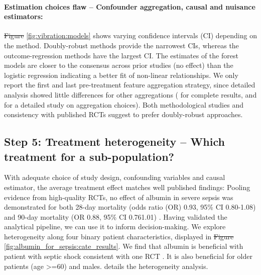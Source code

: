 \documentclass[10pt,letterpaper]{article}
\providecommand{\DIFaddtex}[1]{{\protect\color{blue}\uwave{#1}}} %
\providecommand{\DIFdeltex}[1]{{\protect\color{red}\sout{#1}}}                      %
\providecommand{\DIFaddbegin}{} %
\providecommand{\DIFaddend}{} %
\providecommand{\DIFdelbegin}{} %
\providecommand{\DIFdelend}{} %
\providecommand{\DIFadd}[1]{\texorpdfstring{\DIFaddtex{#1}}{#1}} %
\providecommand{\DIFdel}[1]{\texorpdfstring{\DIFdeltex{#1}}{}} %
\newcommand{\DIFscaledelfig}{0.5}
\newlength{\DIFdelgraphicswidth} %
\newlength{\DIFdelgraphicsheight} %
\newcommand{\DIFaddincludegraphics}[2][]{{\color{blue}\fbox{\DIFOincludegraphics[#1]{#2}}}} %
\newcommand{\DIFdelincludegraphics}[2][]{%
\sbox{\DIFdelgraphicsbox}{\DIFOincludegraphics[#1]{#2}}%
\settoboxwidth{\DIFdelgraphicswidth}{\DIFdelgraphicsbox} %
\settoboxtotalheight{\DIFdelgraphicsheight}{\DIFdelgraphicsbox} %
\scalebox{\DIFscaledelfig}{%
\parbox[b]{\DIFdelgraphicswidth}{\usebox{\DIFdelgraphicsbox}\\[-\baselineskip] \rule{\DIFdelgraphicswidth}{0em}}\llap{\resizebox{\DIFdelgraphicswidth}{\DIFdelgraphicsheight}{%
\setlength{\unitlength}{\DIFdelgraphicswidth}%
\begin{picture}(1,1)%
\thicklines\linethickness{2pt} %
{\color[rgb]{1,0,0}\put(0,0){\framebox(1,1){}}}%
{\color[rgb]{1,0,0}\put(0,0){\line( 1,1){1}}}%
{\color[rgb]{1,0,0}\put(0,1){\line(1,-1){1}}}%
\end{picture}%
}\hspace*{3pt}}} %
} %
\DeclareRobustCommand{\DIFaddbegin}{\DIFOaddbegin \let\includegraphics\DIFaddincludegraphics} %
\DeclareRobustCommand{\DIFaddend}{\DIFOaddend \let\includegraphics\DIFOincludegraphics} %
\DeclareRobustCommand{\DIFdelbegin}{\DIFOdelbegin \let\includegraphics\DIFdelincludegraphics} %
\DeclareRobustCommand{\DIFdelend}{\DIFOaddend \let\includegraphics\DIFOincludegraphics} %
\begin{document}
\paragraph{Estimation choices flaw -- Confounder aggregation, causal and nuisance estimators:}

\DIFdelbegin \DIFdel{Figure }\DIFdelend \DIFaddbegin \DIFadd{Fig }\DIFaddend \ref{fig:vibration:models} shows varying confidence intervals (CI)
depending on the method. Doubly-robust methods provide the narrowest CIs,
whereas the outcome-regression methods have the largest CI. The estimates of the
forest models are closer to the consensus across prior studies (no effect) than
the logistic regression indicating a better fit of non-linear relationships. We
only report the first and last pre-treatment feature aggregation strategy, since
detailed analysis showed little differences for other aggregations (\DIFdelbegin %
\DIFdelend \DIFaddbegin \DIFadd{S7 Fig }\DIFaddend for complete results, and \DIFdelbegin %
\DIFdelend \DIFaddbegin \DIFadd{S9 Fig }\DIFaddend for a detailed study on aggregation choices). Both methodological studies \cite{naimi2023challenges} and
consistency with published RCTs suggest to prefer doubly-robust approaches.

\subsection*{Step 5: Treatment heterogeneity -- Which treatment for a sub-population?}%
\label{sec:treamtent_heterogeneity_mimic_iv}


With adequate choice of study design, confounding variables and causal
estimator, the average treatment effect matches well published findings:
Pooling evidence from high-quality RCTs, no effect of albumin in severe
sepsis was demonstrated for both 28-day mortality (odds ratio (OR) 0.93,
95\% CI 0.80-1.08) and 90-day mortality (OR 0.88, 95\% CI 0.761.01)
\cite{xu2014comparison}.
%
Having validated the analytical pipeline, we can use it to inform
decision-making. We explore
heterogeneity along four binary patient characteristics, displayed in \DIFdelbegin \DIFdel{Figure
}\DIFdelend \DIFaddbegin \DIFadd{Fig
}\DIFaddend \ref{fig:albumin_for_sepsis:cate_results}. We find that albumin is beneficial
with patient with septic shock consistent with one
RCT  \cite{caironi2014albumin}. It is also beneficial for older patients (age >=60) and males. \DIFdelbegin %
\DIFdelend \DIFaddbegin \DIFadd{S7 Appendix }\DIFaddend details the heterogeneity analysis.
\end{document}
